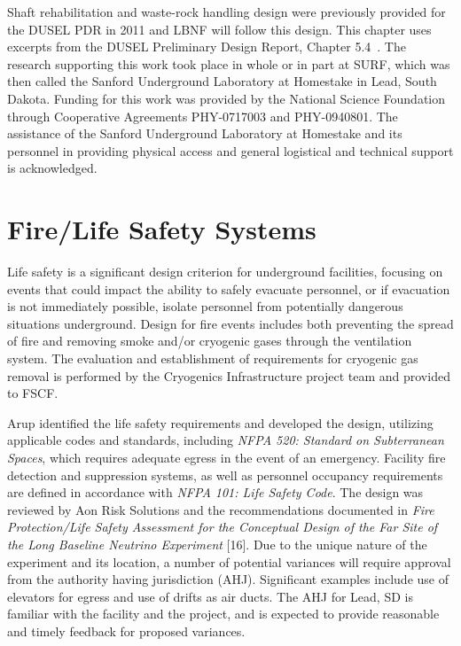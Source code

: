 Shaft rehabilitation and waste-rock handling design were previously provided for the DUSEL PDR in 2011 and LBNF will follow this design. This chapter uses excerpts from the DUSEL Preliminary Design Report, Chapter 5.4~\cite{dusel-pdr}. The research supporting this work took place in whole or in part at SURF, which was then called the Sanford Underground Laboratory at Homestake in Lead, South Dakota. Funding for this work was provided by the National Science Foundation through Cooperative Agreements PHY-0717003 and PHY-0940801. The assistance of the Sanford Underground Laboratory at Homestake and its personnel in providing physical access and general logistical and technical support is acknowledged.

\section{Fire/Life Safety Systems}
\label{sec:fscf-und-fire}

Life safety is a significant design criterion for underground facilities, focusing on events that could impact the ability to safely %
evacuate personnel, or if evacuation is not immediately possible, isolate personnel from potentially dangerous situations %
underground. Design for fire events includes both preventing the spread of fire and removing smoke and/or cryogenic gases through the ventilation system. The evaluation and establishment of requirements for cryogenic gas removal is performed by the Cryogenics Infrastructure project team and provided to FSCF.

Arup identified the life safety requirements and developed the design, utilizing applicable codes and standards, including \textit{NFPA 520: Standard on Subterranean Spaces}, which requires adequate egress in the event of an emergency. Facility fire detection and suppression systems, as well as personnel occupancy requirements are defined in accordance with \textit{NFPA 101: Life Safety Code}. The design was reviewed by Aon Risk Solutions and the recommendations documented in \textit{Fire Protection/Life Safety Assessment for the Conceptual Design of the Far Site of the Long Baseline Neutrino Experiment}  [16]. Due to the unique nature of the experiment and its location, a number of potential variances will require approval from the authority having jurisdiction (AHJ). Significant examples include use of elevators for egress and use of drifts as air ducts. The AHJ for Lead, SD is familiar with the facility and the project, and is expected to provide reasonable and timely feedback for proposed variances.  


